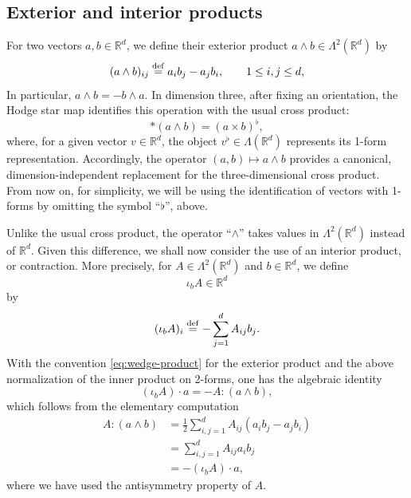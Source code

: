 \documentclass[11pt, leqno, a4paper,]{amsart}
\theoremstyle{remark}
\numberwithin{equation}{section}
\newcommand*{\bydef}{\overset{\rm def}{=}}
\begin{document}
\subsection{Exterior and interior products}
For two vectors $a,b\in \mathbb R^d$, we define their exterior product  
$a\wedge b \in \Lambda^2 (\mathbb R^d)$
 by 
\begin{equation}\label{eq:wedge-product}
(a\wedge b)_{ij}
\bydef
a_i b_j-a_jb_i , \qquad 1\leq i,j
 \leq d,
\end{equation}
In particular, $a\wedge b  = -b\wedge a$. In dimension three, after fixing an orientation, the Hodge star map identifies this operation with the usual cross product:
\begin{equation*}
	* (a\wedge b)= (a\times b)^{\flat},
\end{equation*}  
where, for a given vector $v\in \mathbb R^d$, the object $v^{\flat } \in \Lambda(\mathbb R^d)$ represents its 1-form representation.  Accordingly, the operator   $ (a ,b ) \mapsto a\wedge b $   provides a canonical, dimension-independent replacement for the three-dimensional cross product. From now on, for simplicity, we will be using the identification of vectors with 1-forms by omitting the symbol ``$\flat$'', above. 

Unlike the usual cross product, the operator ``$\wedge$'' takes values in $\Lambda^2 (\mathbb R^d) $ instead of $\mathbb R^d$. Given this difference, we shall now consider the use of an interior product, or contraction. More precisely, for $A\in \Lambda^2 (\mathbb R^d)$ and $b\in \mathbb R^d$, we define 
\begin{equation*}
	\iota_b A \in \mathbb R^d
\end{equation*}
by
\begin{equation}\label{eq:interior-product}
(\iota_b A)_i
\bydef -\sum_{j=1}^d A_{ij}b_j.
\end{equation}
With the convention \eqref{eq:wedge-product} for the exterior product and the above normalization of the inner product on 2-forms, one has the algebraic identity
\begin{equation}\label{eq:wedge-contraction}
(\iota_b A)\cdot a=-
A:(a\wedge b),
\end{equation}
which follows from  the elementary computation
\begin{equation*}
	\begin{aligned}
		A:(a\wedge b)
			&= \frac{1}{2} \sum_{i,j=1}^d A_{ij}  (a_i b_j - a_j b_i)
			\\
			&=   \sum_{i,j=1}^d A_{ij}a_ib_j
			\\
			&= -(\iota_b A)\cdot a,
	\end{aligned}
\end{equation*}
where we have used the antisymmetry property of $A$.
\end{document}
